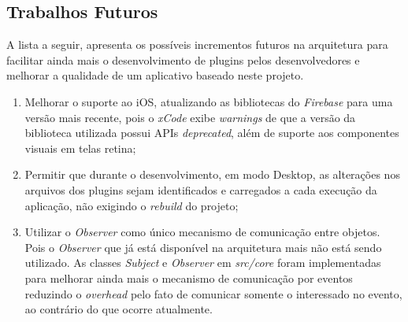 \subsection{Trabalhos Futuros}
A lista a seguir, apresenta os possíveis incrementos futuros na arquitetura para facilitar ainda mais o desenvolvimento de plugins pelos desenvolvedores e melhorar a qualidade de um aplicativo baseado neste projeto.

\begin{enumerate}
	\item Melhorar o suporte ao iOS, atualizando as bibliotecas do \textit{Firebase} para uma versão mais recente, pois o \textit{xCode} exibe \textit{warnings} de que a versão da biblioteca utilizada possui APIs \textit{deprecated}, além de suporte aos componentes visuais em telas retina;

	\item Permitir que durante o desenvolvimento, em modo Desktop, as alterações nos arquivos dos plugins sejam identificados e carregados a cada execução da aplicação, não exigindo o \textit{rebuild} do projeto;

	\item Utilizar o \textit{Observer} como único mecanismo de comunicação entre objetos. Pois o \textit{Observer} que já está disponível na arquitetura mais não está sendo utilizado. As classes \textit{Subject} e \textit{Observer} em \textit{src/core} foram implementadas para melhorar ainda mais o mecanismo de comunicação por eventos reduzindo o \textit{overhead} pelo fato de comunicar somente o interessado no evento, ao contrário do que ocorre atualmente.
\end{enumerate}